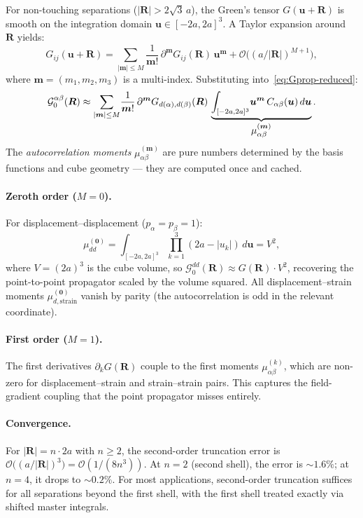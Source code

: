 \documentclass[11pt,a4paper]{article}
\newcommand{\order}{\mathcal{O}}
\newcommand{\bu}{\bm{u}}
\newcommand{\bR}{\bm{R}}
\newcommand{\Gprop}{\mathcal{G}_0}
\theoremstyle{plain}
\theoremstyle{definition}
\theoremstyle{remark}
\begin{document}
For non-touching separations ($|\bR| > 2\sqrt{3}\,a$), the
Green's tensor $G(\bu + \bR)$ is smooth on the integration domain
$\bu \in [-2a, 2a]^3$.  A Taylor expansion around~$\bR$ yields:
\begin{equation}
  G_{ij}(\bu + \bR)
  = \sum_{|\bm{m}| \le M}\!
    \frac{1}{\bm{m}!}\,
    \partial^{\bm{m}} G_{ij}(\bR)\,\bu^{\bm{m}}
  + \order\bigl((a/|\bR|)^{M+1}\bigr),
  \label{eq:G-taylor}
\end{equation}
where $\bm{m} = (m_1, m_2, m_3)$ is a multi-index.  Substituting
into~\eqref{eq:Gprop-reduced}:
\begin{equation}
  \Gprop^{\alpha\beta}(\bR)
  \approx \sum_{|\bm{m}| \le M}\!
    \frac{1}{\bm{m}!}\,
    \partial^{\bm{m}} G_{d(\alpha),d(\beta)}(\bR)\,
    \underbrace{\int_{[-2a,2a]^3}\!
      \bu^{\bm{m}}\,C_{\alpha\beta}(\bu)\,d\bu}_{%
      \displaystyle \mu_{\alpha\beta}^{(\bm{m})}}.
  \label{eq:Gprop-multipole}
\end{equation}
The \emph{autocorrelation moments}
$\mu_{\alpha\beta}^{(\bm{m})}$ are pure numbers determined by the
basis functions and cube geometry --- they are computed once and
cached.

\paragraph{Zeroth order ($M = 0$).}
For displacement--displacement ($p_\alpha = p_\beta = 1$):
\begin{equation}
  \mu_{dd}^{(\bm{0})}
  = \int_{[-2a,2a]^3}\!\prod_{k=1}^3(2a - |u_k|)\,d\bu = V^2,
  \label{eq:tent-norm}
\end{equation}
where $V = (2a)^3$ is the cube volume, so
$\Gprop^{dd}(\bR) \approx G(\bR) \cdot V^2$, recovering the
point-to-point propagator scaled by the volume squared.  All
displacement--strain moments $\mu_{d,\mathrm{strain}}^{(\bm{0})}$
vanish by parity (the autocorrelation is odd in the relevant
coordinate).

\paragraph{First order ($M = 1$).}
The first derivatives $\partial_k G(\bR)$ couple to the first
moments $\mu_{\alpha\beta}^{(k)}$, which are non-zero for
displacement--strain and strain--strain pairs.  This captures the
field-gradient coupling that the point propagator misses entirely.

\paragraph{Convergence.}
For $|\bR| = n \cdot 2a$ with $n \ge 2$, the second-order
truncation error is $\order\bigl((a/|\bR|)^3\bigr) =
\order(1/(8n^3))$.  At $n = 2$ (second shell), the error is
$\sim 1.6\%$; at $n = 4$, it drops to $\sim 0.2\%$.  For most
applications, second-order truncation suffices for all separations
beyond the first shell, with the first shell treated exactly via
shifted master integrals.
\end{document}
